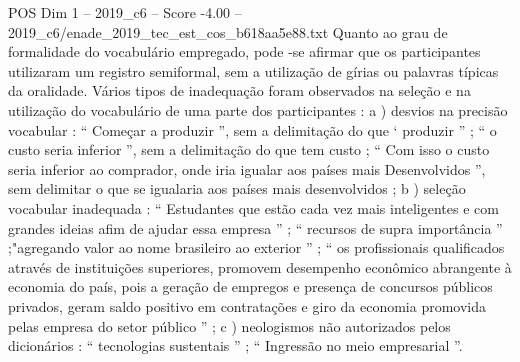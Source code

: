 \begin{textsample}{POS Dim 1 – 2019\_c6 – Score -4.00 – 2019\_c6/enade\_2019\_tec\_est\_cos\_b618aa5e88.txt}
Quanto ao grau de formalidade do vocabulário empregado, pode -se afirmar que os participantes utilizaram um registro semiformal, sem a utilização de gírias ou palavras típicas da oralidade.
Vários tipos de inadequação foram observados na seleção e na utilização do vocabulário de uma parte dos participantes : a ) desvios na precisão vocabular : “ Começar a produzir ”, sem a delimitação do que ‘ produzir ” ; “ o custo seria inferior ”, sem a delimitação do que tem custo ; “ Com isso o custo seria inferior ao comprador, onde iria igualar aos países mais Desenvolvidos ”, sem delimitar o que se igualaria aos países mais desenvolvidos ; b ) seleção vocabular inadequada : “ Estudantes que estão cada vez mais inteligentes e com grandes ideias afim de ajudar essa empresa ” ; “ recursos de supra importância ” ;"agregando valor ao nome brasileiro ao exterior ” ; “ os profissionais qualificados através de instituições superiores, promovem desempenho econômico abrangente à economia do país, pois a geração de empregos e presença de concursos públicos privados, geram saldo positivo em contratações e giro da economia promovida pelas empresa do setor público ” ; c ) neologismos não autorizados pelos dicionários : “ tecnologias sustentais ” ; “ Ingressão no meio empresarial ”.

\end{textsample}
